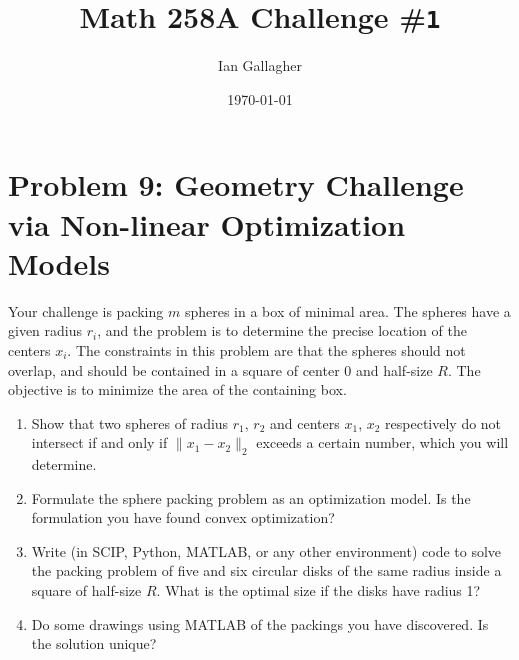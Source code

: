 \documentclass[11pt]{article}
\title{Math 258A Challenge \#\texttt{1}}
\author{Ian Gallagher}
\date{\today}
\theoremstyle{problemstyle}
\begin{document}
\maketitle

\section*{Problem 9: Geometry Challenge via Non-linear Optimization Models}
Your challenge is packing $m$ spheres in a box of minimal area. The spheres have a given radius $r_i$, and the problem
is to determine the precise location of the centers $x_i$. The constraints in this problem are that the spheres should
not overlap, and should be contained in a square of center $0$ and half-size $R$. The objective is to minimize the area
of the containing box.
\begin{enumerate}
    \item Show that two spheres of radius $r_1$, $r_2$ and centers $x_1$, $x_2$
        respectively do not intersect if and only if $\|x_1 - x_2\|_2$ exceeds
        a certain number, which you will determine.
    \item Formulate the sphere packing problem as an optimization model. Is the
        formulation you have found convex optimization?
    \item Write (in SCIP, Python, MATLAB, or any other environment) code to
        solve the packing problem of five and six circular disks of the same
        radius inside a square of half-size $R$. What is the optimal size if
        the disks have radius 1?
    \item Do some drawings using MATLAB of the packings you have discovered. Is
        the solution unique?
\end{enumerate}
\end{document}
